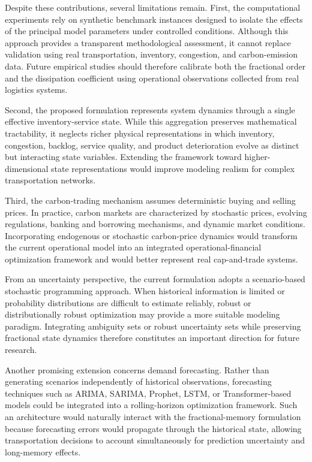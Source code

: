 Despite these contributions, several limitations remain. First, the computational experiments rely on synthetic benchmark instances designed to isolate the effects of the principal model parameters under controlled conditions. Although this approach provides a transparent methodological assessment, it cannot replace validation using real transportation, inventory, congestion, and carbon-emission data. Future empirical studies should therefore calibrate both the fractional order and the dissipation coefficient using operational observations collected from real logistics systems.

Second, the proposed formulation represents system dynamics through a single effective inventory-service state. While this aggregation preserves mathematical tractability, it neglects richer physical representations in which inventory, congestion, backlog, service quality, and product deterioration evolve as distinct but interacting state variables. Extending the framework toward higher-dimensional state representations would improve modeling realism for complex transportation networks.

Third, the carbon-trading mechanism assumes deterministic buying and selling prices. In practice, carbon markets are characterized by stochastic prices, evolving regulations, banking and borrowing mechanisms, and dynamic market conditions. Incorporating endogenous or stochastic carbon-price dynamics would transform the current operational model into an integrated operational-financial optimization framework and would better represent real cap-and-trade systems.

From an uncertainty perspective, the current formulation adopts a scenario-based stochastic programming approach. When historical information is limited or probability distributions are difficult to estimate reliably, robust or distributionally robust optimization may provide a more suitable modeling paradigm. Integrating ambiguity sets or robust uncertainty sets while preserving fractional state dynamics therefore constitutes an important direction for future research.

Another promising extension concerns demand forecasting. Rather than generating scenarios independently of historical observations, forecasting techniques such as ARIMA, SARIMA, Prophet, LSTM, or Transformer-based models could be integrated into a rolling-horizon optimization framework. Such an architecture would naturally interact with the fractional-memory formulation because forecasting errors would propagate through the historical state, allowing transportation decisions to account simultaneously for prediction uncertainty and long-memory effects.

